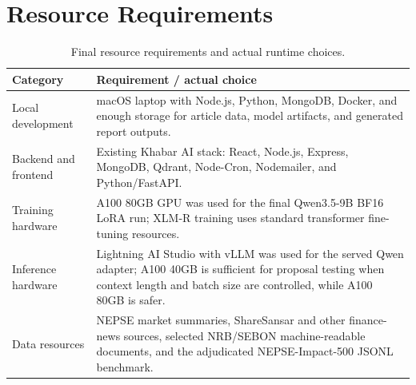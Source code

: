 \documentclass[12pt,a4paper]{report}
\begin{document}
\section{Resource Requirements}
\begin{table}[H]
\centering
\caption{Final resource requirements and actual runtime choices.}
\label{tab:resource-requirements}
\small
\begin{tabularx}{\textwidth}{@{}L{0.26\textwidth}Y@{}}
\toprule
Category & Requirement / actual choice \\
\midrule
Local development & macOS laptop with Node.js, Python, MongoDB, Docker, and enough storage for article data, model artifacts, and generated report outputs. \\
Backend and frontend & Existing Khabar AI stack: React, Node.js, Express, MongoDB, Qdrant, Node-Cron, Nodemailer, and Python/FastAPI. \\
Training hardware & A100 80GB GPU was used for the final Qwen3.5-9B BF16 LoRA run; XLM-R training uses standard transformer fine-tuning resources. \\
Inference hardware & Lightning AI Studio with vLLM was used for the served Qwen adapter; A100 40GB is sufficient for proposal testing when context length and batch size are controlled, while A100 80GB is safer. \\
Data resources & NEPSE market summaries, ShareSansar and other finance-news sources, selected NRB/SEBON machine-readable documents, and the adjudicated NEPSE-Impact-500 JSONL benchmark. \\
\bottomrule
\end{tabularx}
\end{table}
\end{document}
